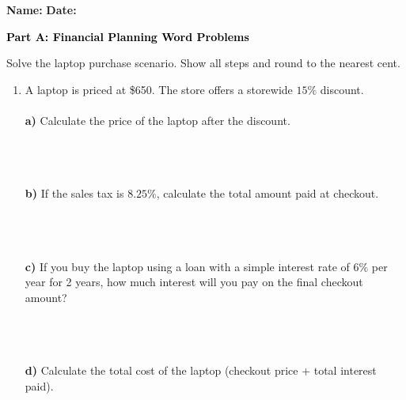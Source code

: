 \documentclass[12pt, letterpaper, fleqn]{article}
\begin{document}
\textbf{Name:} \underline{\hspace{5cm}}
\hfill
\textbf{Date:} \underline{\hspace{3cm}}\\

\begin{tcolorbox}[colback=black!10]
    \large\textcolor{black}{\textbf{Part A: Financial Planning Word Problems}}
\end{tcolorbox}

\vspace{3mm}

\noindent
Solve the laptop purchase scenario. Show all steps and round to the nearest cent.

\vspace{5mm}

\begin{enumerate}[itemsep=3cm, leftmargin=0.6cm]
\item A laptop is priced at \$650. The store offers a storewide $15\%$ discount. \\ \\
\textbf{a)} Calculate the price of the laptop after the discount. \\ \\
 \\ \\

\vspace{1cm}

\textbf{b)} If the sales tax is $8.25\%$, calculate the total amount paid at checkout. \\ \\
 \\ \\
\vspace{1cm}

\textbf{c)} If you buy the laptop using a loan with a simple interest rate of $6\%$ per year for 2 years, how much interest will you pay on the final checkout amount? \\ \\
 \\ \\
\vspace{1cm}

\textbf{d)} Calculate the total cost of the laptop (checkout price + total interest paid). \\ \\

\end{enumerate}
\end{document}
